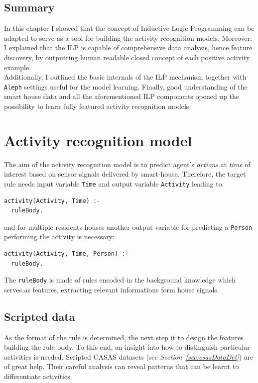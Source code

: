 \documentclass[10pt, a4paper, pdflatex, leqno, twoside, openright]{report}
\begin{document}
  \section{Summary}
In this chapter I showed that the concept of Inductive Logic Programming can be adapted to serve as a tool for building the activity recognition models. Moreover, I explained that the ILP is capable of comprehensive data analysis, hence feature discovery, by outputting human readable closed concept of each positive activity example.\\
Additionally, I outlined the basic internals of the ILP mechanism together with \texttt{Aleph} settings useful for the model learning. Finally, good understanding of the smart house data and all the aforementioned ILP components opened up the possibility to learn fully featured activity recognition models.

\chapter{Activity recognition model}
The aim of the activity recognition model is to predict agent's \emph{actions} at \emph{time} of interest based on sensor signals delivered by smart-house. Therefore, the target rule needs input variable \texttt{Time} and output variable \texttt{Activity} leading to:\\
\begin{verbatim}
activity(Activity, Time) :-
  ruleBody.
\end{verbatim}
and for multiple residents houses another output variable for predicting a \texttt{Person} performing the activity is necessary:\\
\begin{verbatim}
activity(Activity, Time, Person) :-
  ruleBody.
\end{verbatim}
The \texttt{ruleBody} is made of rules encoded in the background knowledge which serves as features, extracting relevant informations form house signals.

  \section{Scripted data} %
As the format of the rule is determined, the next step it to design the features building the rule body. To this end, an insight into how to distinguish particular activities is needed. Scripted CASAS datasets (see \emph{Section~\ref{sec:csasDataDet}}) are of great help. Their careful analysis can reveal patterns that can be learnt to differentiate activities.
\end{document}
